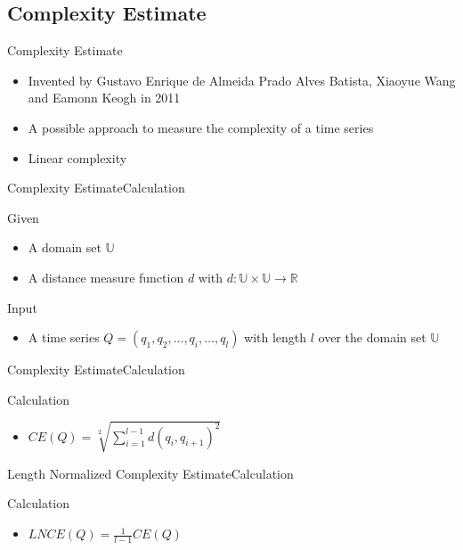 \subsection{Complexity Estimate}

\begin{frame}{Complexity Estimate}
    \begin{itemize}
        \item Invented by Gustavo Enrique de Almeida Prado Alves Batista, Xiaoyue Wang and Eamonn Keogh in 2011
            \cite{batista2011complexity}
        \pause
        \item A possible approach to measure the complexity of a time series
        \pause
        \item Linear complexity
    \end{itemize}
\end{frame}

\begin{frame}{Complexity Estimate}{Calculation}
    \begin{block}{Given}
        \begin{itemize}
            \item A domain set $\mathbb{U}$
            \pause
            \item A distance measure function $d$ with $d: \mathbb{U} \times \mathbb{U} \to \mathbb{R}$
            \pause
        \end{itemize}
    \end{block}
    \begin{block}{Input}
        \begin{itemize}
            \item A time series $Q = (q_1, q_2, \dots, q_i, \dots, q_l)$ with length $l$ over the domain set
                $\mathbb{U}$
        \end{itemize}
    \end{block}
\end{frame}

\begin{frame}{Complexity Estimate}{Calculation}
    \begin{block}{Calculation}
        \begin{itemize}
            \item $CE(Q) = \sqrt[2]{\sum \limits_{i=1}^{l-1} d(q_i, q_{i + 1})^2}$
        \end{itemize}
    \end{block}
\end{frame}

\begin{frame}{Length Normalized Complexity Estimate}{Calculation}
    \begin{block}{Calculation}
        \begin{itemize}
            \item $LNCE(Q) = \frac{1}{l-1}CE(Q)$
        \end{itemize}
    \end{block}
\end{frame}
